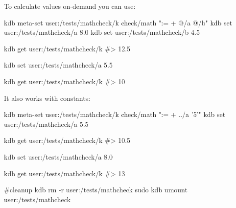 To calculate values on-\/demand you can use\+:


\begin{DoxyCode}
kdb meta-set user:/tests/mathcheck/k check/math ":= + @/a @/b"
kdb set user:/tests/mathcheck/a 8.0
kdb set user:/tests/mathcheck/b 4.5

kdb get user:/tests/mathcheck/k
#> 12.5

kdb set user:/tests/mathcheck/a 5.5

kdb get user:/tests/mathcheck/k
#> 10
\end{DoxyCode}


It also works with constants\+:


\begin{DoxyCode}
kdb meta-set user:/tests/mathcheck/k check/math ":= + ../a '5'"
kdb set user:/tests/mathcheck/a 5.5

kdb get user:/tests/mathcheck/k
#> 10.5

kdb set user:/tests/mathcheck/a 8.0

kdb get user:/tests/mathcheck/k
#> 13

#cleanup
kdb rm -r user:/tests/mathcheck
sudo kdb umount user:/tests/mathcheck
\end{DoxyCode}
 